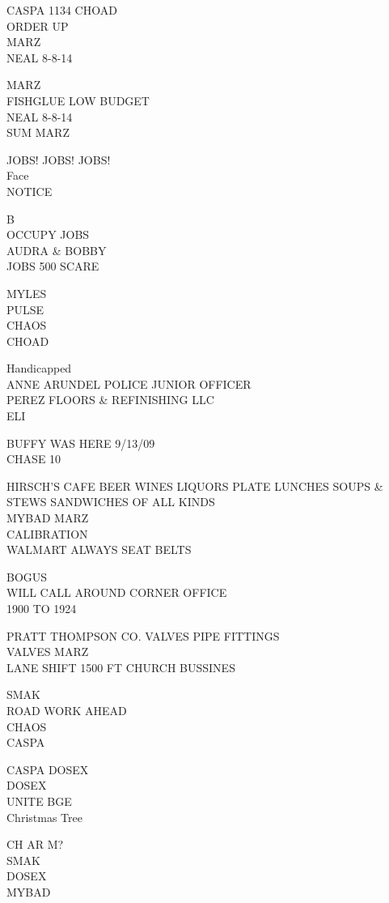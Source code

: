\documentclass[10pt,letterpaper]{article}
\begin{document}
CASPA 1134 CHOAD\\
ORDER UP\\
MARZ\\
NEAL 8{-}8{-}14

MARZ\\
FISHGLUE LOW BUDGET\\
NEAL 8{-}8{-}14\\
SUM MARZ

JOBS!  JOBS!  JOBS!\\
Face\\
NOTICE

B\\
OCCUPY JOBS\\
AUDRA \& BOBBY\\
JOBS 500 SCARE

MYLES\\
PULSE\\
CHAOS\\
CHOAD

Handicapped\\
ANNE ARUNDEL POLICE JUNIOR OFFICER\\
PEREZ FLOORS \& REFINISHING LLC\\
ELI

BUFFY WAS HERE 9/13/09\\
CHASE 10

HIRSCH'S CAFE BEER WINES LIQUORS PLATE LUNCHES SOUPS \& STEWS SANDWICHES OF ALL KINDS\\
MYBAD MARZ\\
CALIBRATION\\
WALMART ALWAYS SEAT BELTS

BOGUS\\
WILL CALL AROUND CORNER OFFICE\\
1900 TO 1924

PRATT THOMPSON CO. VALVES PIPE FITTINGS\\
VALVES MARZ\\
LANE SHIFT 1500 FT CHURCH BUSSINES

SMAK\\
ROAD WORK AHEAD\\
CHAOS\\
CASPA

CASPA DOSEX\\
DOSEX\\
UNITE BGE\\
Christmas Tree

CH AR M?\\
SMAK\\
DOSEX\\
MYBAD
\end{document}
